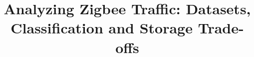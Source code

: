 \documentclass[preprint,12pt]{elsarticle}
\begin{document}
\begin{frontmatter}



\title{Analyzing Zigbee Traffic: Datasets, Classification and Storage Trade-offs}

\end{frontmatter}
\end{document}

